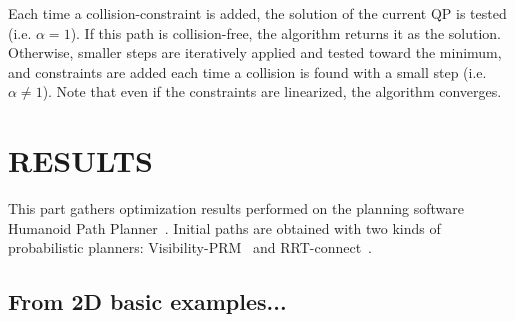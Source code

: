 \documentclass{tADR2e}
\begin{document}
Each time a collision-constraint is added, 
the solution of the current QP is tested (i.e. $\alpha = 1$). If this path is collision-free, the algorithm returns it as the solution. Otherwise, 
smaller steps are iteratively applied and tested toward the minimum, and constraints are added each time a collision is found with a small step (i.e. $\alpha \neq 1$).
Note that even if the constraints are linearized, the algorithm converges.


\section{RESULTS}

This part gathers optimization results performed on the planning software 
Humanoid Path Planner~\cite{hpp}. Initial paths are obtained with two 
kinds of probabilistic planners: Visibility-PRM~\cite{visibility-prm} and 
RRT-connect~\cite{rrt-connect}.

\subsection{From 2D basic examples...}
\end{document}
